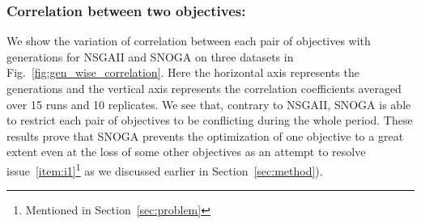\subsubsection{Correlation between two objectives:} We show the variation of correlation between each pair of objectives with generations for NSGAII and SNOGA on three datasets in Fig.~\ref{fig:gen_wise_correlation}. Here the horizontal axis represents the generations and the vertical axis represents the correlation coefficients averaged over 15 runs and 10 replicates. We see that, contrary to NSGAII, SNOGA is able to restrict each pair of objectives to be conflicting during the whole period. These results prove that SNOGA prevents the optimization of one objective to a great extent even at the loss of some other objectives as an attempt to resolve issue~\ref{item:i1}\footnote{Mentioned in Section~\ref{sec:problem}} as we discussed earlier in Section~\ref{sec:method}). %

